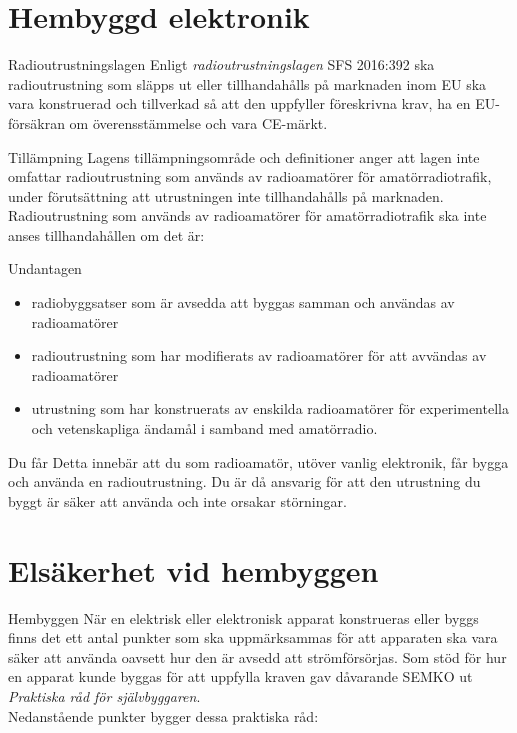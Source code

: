\documentclass{beamer}
\begin{document}
\section{Hembyggd elektronik}

\begin{frame}{Radioutrustningslagen}
Enligt \emph{radioutrustningslagen} SFS 2016:392 ska radioutrustning som släpps
ut eller tillhandahålls på marknaden inom EU ska vara konstruerad och tillverkad
så att den uppfyller föreskrivna krav, ha en EU-försäkran om överensstämmelse
och vara CE-märkt.
\end{frame}

\begin{frame}{Tillämpning}
Lagens tillämpningsområde och definitioner anger att lagen inte omfattar
radioutrustning som används av radioamatörer för amatörradiotrafik, under
förutsättning att utrustningen inte tillhandahålls på marknaden.
Radioutrustning som används av radioamatörer för amatörradiotrafik ska inte
anses tillhandahållen om det är:
\end{frame}

\begin{frame}{Undantagen}
\begin{itemize}
	\item radiobyggsatser som är avsedda att byggas samman och användas av
	radioamatörer
	\item radioutrustning som har modifierats av radioamatörer för att
	avvändas av radioamatörer
	\item utrustning som har konstruerats av enskilda radioamatörer för
	experimentella och vetenskapliga ändamål i samband med amatörradio.
\end{itemize}
\end{frame}

\begin{frame}{Du får}
Detta innebär att du som radioamatör, utöver vanlig elektronik, får bygga
och använda en radioutrustning.
Du är då ansvarig för att den utrustning du byggt är säker att använda och inte
orsakar störningar.
\end{frame}

\section{Elsäkerhet vid hembyggen}
\begin{frame}{Hembyggen}
När en elektrisk eller elektronisk apparat konstrueras eller byggs finns det
ett antal punkter som ska uppmärksammas för att apparaten ska vara säker att
använda oavsett hur den är avsedd att strömförsörjas.
Som stöd för hur en apparat kunde byggas för att uppfylla kraven gav
dåvarande SEMKO ut \emph{Praktiska råd för självbyggaren}.\\
\vspace{5mm}
Nedanstående punkter bygger dessa praktiska råd:
\end{frame}
\end{document}
